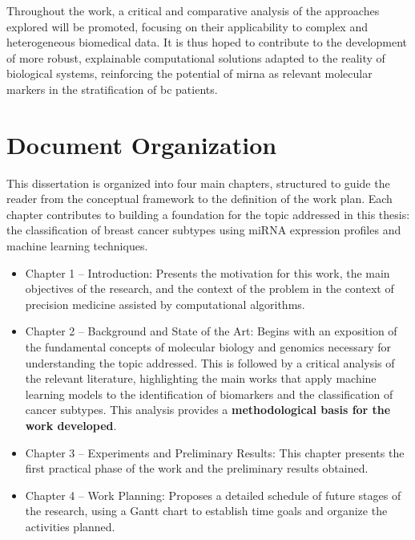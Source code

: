 Throughout the work, a critical and comparative analysis of the approaches
explored will be promoted, focusing on their applicability to complex and
heterogeneous biomedical data. It is thus hoped to contribute to the
development of more robust, explainable computational solutions adapted to the
reality of biological systems, reinforcing the potential of \gls{mirna} as
relevant molecular markers in the stratification of \gls{bc} patients.

\section{Document Organization}
\label{sec:document-organization}
This dissertation is organized into four main chapters, structured to guide the
reader from the conceptual framework to the definition of the work plan. Each
chapter contributes to building a foundation for the topic addressed in this
thesis: the classification of breast cancer subtypes using miRNA expression
profiles and machine learning techniques.
\begin{itemize}
  \item Chapter 1 – Introduction: Presents the motivation for this work, the main
        objectives of the research, and the context of the problem in the context of
        precision medicine assisted by computational algorithms.

  \item Chapter 2 – Background and State of the Art: Begins with an exposition of the
        fundamental concepts of molecular biology and genomics necessary for
        understanding the topic addressed. This is followed by a critical analysis of
        the relevant literature, highlighting the main works that apply machine
        learning models to the identification of biomarkers and the classification of
        cancer subtypes. This analysis provides a \textbf{methodological basis for the
          work developed}.

  \item Chapter 3 – Experiments and Preliminary Results: This chapter presents the
        first practical phase of the work and the preliminary results obtained.

  \item Chapter 4 – Work Planning: Proposes a detailed schedule of future stages of the
        research, using a Gantt chart to establish time goals and organize the
        activities planned.
\end{itemize}
